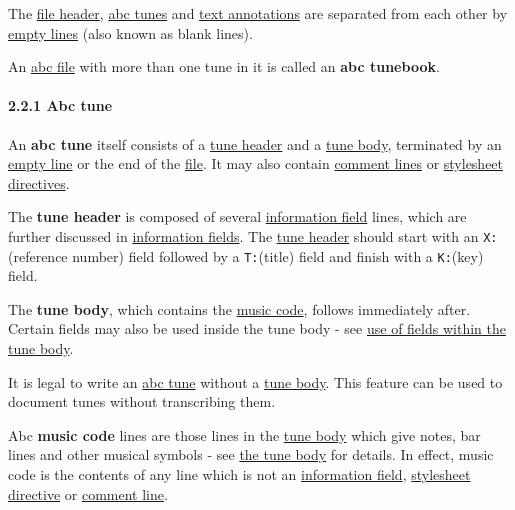 The \protect\hyperlink{file_header_definition}{file header},
\protect\hyperlink{abc_tune_definition}{abc tunes} and
\protect\hyperlink{free_text_and_typeset_text}{text annotations} are
separated from each other by
\protect\hyperlink{empty_line_definition}{empty lines} (also known as
blank lines).

\href{}{}An \protect\hyperlink{abc_file_definition}{abc file} with more
than one tune in it is called an \textbf{abc tunebook}.

\hypertarget{abc_tune}{\paragraph{2.2.1 Abc tune}\label{abc_tune}}

\href{}{}An \textbf{abc tune} itself consists of a
\protect\hyperlink{tune_header_definition}{tune header} and a
\protect\hyperlink{tune_body_definition}{tune body}, terminated by an
\protect\hyperlink{empty_line_definition}{empty line} or the end of the
\protect\hyperlink{abc_file_definition}{file}. It may also contain
\protect\hyperlink{comment_definition}{comment lines} or
\protect\hyperlink{stylesheet_directive_definition}{stylesheet
directives}.

\href{}{}The \textbf{tune header} is composed of several
\protect\hyperlink{information_field_definition}{information field}
lines, which are further discussed in
\protect\hyperlink{information_fields}{information fields}. The
\protect\hyperlink{tune_header_definition}{tune header} should start
with an \texttt{X:}(reference number) field followed by a
\texttt{T:}(title) field and finish with a \texttt{K:}(key) field.

\href{}{}The \textbf{tune body}, which contains the
\protect\hyperlink{music_code_definition}{music code}, follows
immediately after. Certain fields may also be used inside the tune body
- see \protect\hyperlink{use_of_fields_within_the_tune_body}{use of
fields within the tune body}.

It is legal to write an \protect\hyperlink{abc_tune_definition}{abc
tune} without a \protect\hyperlink{tune_body_definition}{tune body}.
This feature can be used to document tunes without transcribing them.

\href{}{}Abc \textbf{music code} lines are those lines in the
\protect\hyperlink{tune_body_definition}{tune body} which give notes,
bar lines and other musical symbols - see
\protect\hyperlink{the_tune_body}{the tune body} for details. In effect,
music code is the contents of any line which is not an
\protect\hyperlink{information_field_definition}{information field},
\protect\hyperlink{stylesheet_directive_definition}{stylesheet
directive} or \protect\hyperlink{comment_definition}{comment line}.

